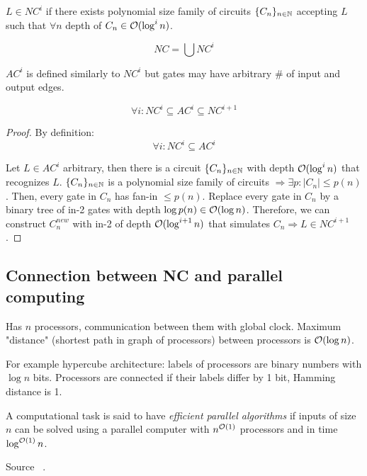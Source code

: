 \begin{definition}[Class NC]
	$L \in NC^i$ if there exists polynomial size family of circuits $\{ C_n \}_{n \in \operatorname{\mathbb{N}}}$ accepting $L$ such that $\forall n$ depth of $C_n \in \mathcal{O}(\log^i n)$.

	\[ NC = \bigcup NC^i \]
\end{definition}

\begin{definition}[Class AC]
	$AC^i$ is defined similarly to $NC^i$ but gates may have arbitrary \# of input and output edges.
\end{definition}

\begin{theorem}[NC and AC]\label{ac_dc}
	\[ \forall i: NC^i \subseteq AC^i \subseteq NC^{i + 1} \]
\end{theorem}
\begin{proof}
	By definition:
	\[ \forall i: NC^i \subseteq AC^i \]

	Let $L \in AC^i$ arbitrary, then there is a circuit $\{ C_n \}_{n \in \operatorname{\mathbb{N}}}$ with depth $\mathcal{O}(\log^i n)$ that recognizes $L$.
	$\{ C_n \}_{n \in \operatorname{\mathbb{N}}}$ is a polynomial size family of circuits $\Rightarrow \exists p: |C_n| \leq p(n)$.
	Then, every gate in $C_n$ has fan-in $\leq p(n)$.
	Replace every gate in $C_n$ by a binary tree of in-2 gates with depth $\log p(n) \in \mathcal{O}(\log n)$.
	Therefore, we can construct $C_n^{new}$ with in-2 of depth $\mathcal{O}(\log^{i + 1} n)$ that simulates $C_n \Rightarrow L \in NC^{i + 1}$.
\end{proof}

\subsection{Connection between NC and parallel computing}

\begin{definition}
	Has $n$ processors, communication between them with global clock.
	Maximum "distance" (shortest path in graph of processors) between processors is $\mathcal{O}(\log n)$.

	For example hypercube architecture: labels of processors are binary numbers with $\log n$ bits.
	Processors are connected if their labels differ by 1 bit, Hamming distance is 1.
\end{definition}

\begin{definition}
	A computational task is said to have \emph{efficient parallel algorithms} if inputs of size $n$ can be solved using a parallel computer with $n^{\mathcal{O}(1)}$ processors and in time $\log^{\mathcal{O}(1)} n$.

	Source ~\cite[p.~109]{arora2009computational}.
\end{definition}

